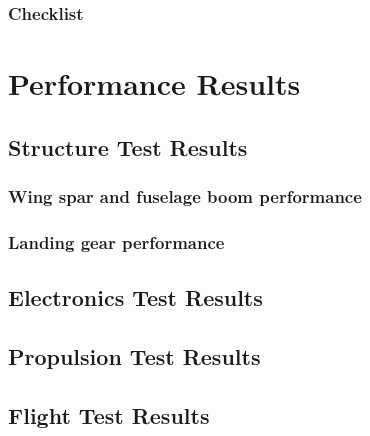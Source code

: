 \newpage
\subsubsection{Checklist}


\section{Performance Results}

\subsection{Structure Test Results}

\subsubsection{Wing spar and fuselage boom performance}

\subsubsection{Landing gear performance}

\subsection{Electronics Test Results}

\subsection{Propulsion Test Results}

\subsection{Flight Test Results}
